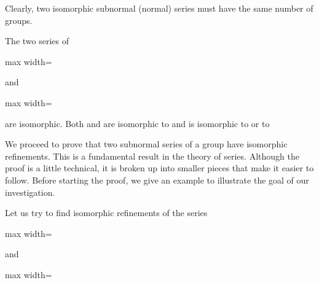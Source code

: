 \documentclass[11pt,oneside]{article}
\begin{document}
\begin{BookBody}

Clearly, two isomorphic subnormal (normal) series must have the same number of groups.

 The two series of 

\begin{center}\begin{adjustbox}{max width=\linewidth}\end{adjustbox}\end{center}

\noindent and

\begin{center}\begin{adjustbox}{max width=\linewidth}\end{adjustbox}\end{center}

\noindent are isomorphic. Both  and  are isomorphic to  and  is isomorphic to  or to \BookEnd{\blacktriangle}


\noindent We proceed to prove that two subnormal series of a group  have isomorphic refinements. This is a fundamental result in the theory of series. Although the proof is a little technical, it is broken up into smaller pieces that make it easier to follow. Before starting the proof, we give an example to illustrate the goal of our investigation.

 Let us try to find isomorphic refinements of the series

\begin{center}\begin{adjustbox}{max width=\linewidth}\end{adjustbox}\end{center}

\noindent and

\begin{center}\begin{adjustbox}{max width=\linewidth}\end{adjustbox}\end{center}


\end{BookBody}
\end{document}
